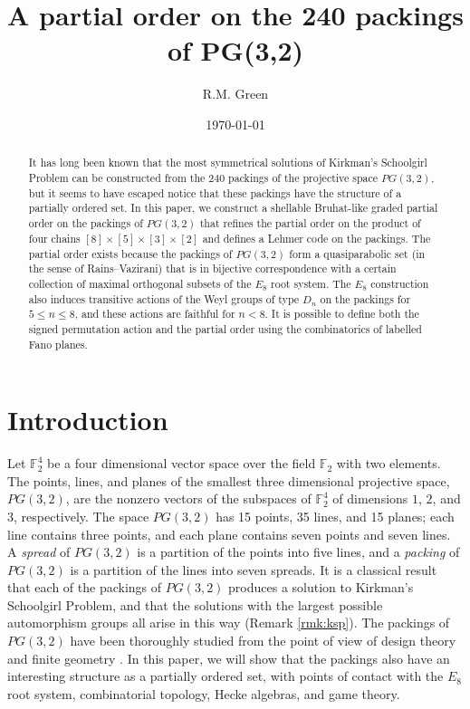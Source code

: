 \documentclass{amsart}
\title{A partial order on the 240 packings of PG(3,2)}
\author{R.M. Green}
\date{\today}
\theoremstyle{plain}
\theoremstyle{definition}
\theoremstyle{remark}
\numberwithin{equation}{section}
\newcommand{\F}{{\mathbb F}}
\begin{document}
\begin{abstract}
It has long been known that the most symmetrical solutions of Kirkman's Schoolgirl Problem can be constructed
from the $240$ packings of the projective space $PG(3, 2)$, but it seems to have escaped notice that these packings 
have the structure of a partially ordered set. In this paper, we construct a shellable Bruhat-like graded partial order 
on the packings of $PG(3, 2)$ that refines the partial order on the product of four chains $[8]\times[5]\times[3]\times[2]$ 
and defines a Lehmer code on the packings. The partial order exists because the packings of $PG(3, 2)$ form a 
quasiparabolic set (in the sense of Rains--Vazirani) that is in bijective correspondence with a certain collection 
of maximal orthogonal subsets of the $E_8$ root system. The $E_8$ construction also induces transitive actions 
of the Weyl groups of type $D_n$ on the packings for $5 \leq n \leq 8$, and these actions are faithful for $n < 8$.
It is possible to define both the signed permutation action and the partial order using the combinatorics of labelled 
Fano planes.
\end{abstract}
\maketitle

\section{Introduction}\label{sec:intro}

Let $\F_2^4$ be a four dimensional vector space over the field $\F_2$ with two elements. The points, lines, and planes
of the smallest three dimensional projective space, $PG(3, 2)$, are the nonzero vectors of the subspaces of $\F_2^4$ of 
dimensions $1$, $2$, and $3$, respectively. The space $PG(3, 2)$ has 15 points, 35 lines, and 15 planes;
each line contains three points, and each plane contains seven points and seven lines. A {\it spread} of $PG(3, 2)$ is a 
partition of the points into five lines, and a {\it packing} of $PG(3, 2)$ is a partition of the lines into seven spreads. 
It is a classical result that each of the packings of $PG(3, 2)$ produces a solution to Kirkman's Schoolgirl 
Problem, and that the solutions with the largest possible automorphism groups all arise in this way (Remark \ref{rmk:ksp}).
The packings of $PG(3, 2)$ have been thoroughly studied from the point of view of design theory 
\cite[\S1]{mathon97overlarge} \cite[\S2]{mathon97seven} and finite geometry \cite[\S17]{hirschfeld85}. In this paper,
we will show that the packings also have an interesting structure as a partially ordered set, with points of contact
with the $E_8$ root system, combinatorial topology, Hecke algebras, and game theory.
\end{document}
